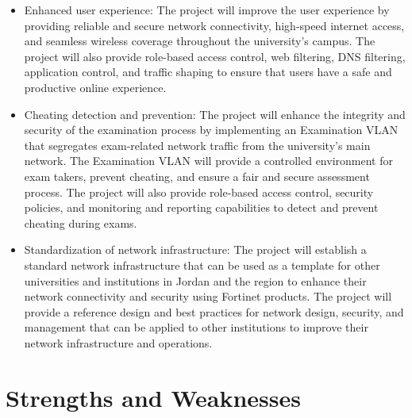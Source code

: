 \documentclass[12pt]{report}
\begin{document}
\begin{itemize}
    \item Enhanced user experience: The project will improve the user experience by providing reliable and secure network connectivity, high-speed internet access, and seamless wireless coverage throughout the university's campus. The project will also provide role-based access control, web filtering, DNS filtering, application control, and traffic shaping to ensure that users have a safe and productive online experience.
    \item Cheating detection and prevention: The project will enhance the integrity and security of the examination process by implementing an Examination VLAN that segregates exam-related network traffic from the university's main network. The Examination VLAN will provide a controlled environment for exam takers, prevent cheating, and ensure a fair and secure assessment process. The project will also provide role-based access control, security policies, and monitoring and reporting capabilities to detect and prevent cheating during exams.
    \item Standardization of network infrastructure: The project will establish a standard network infrastructure that can be used as a template for other universities and institutions in Jordan and the region to enhance their network connectivity and security using Fortinet products. The project will provide a reference design and best practices for network design, security, and management that can be applied to other institutions to improve their network infrastructure and operations.

\end{itemize}

\section{Strengths and Weaknesses}
\end{document}
